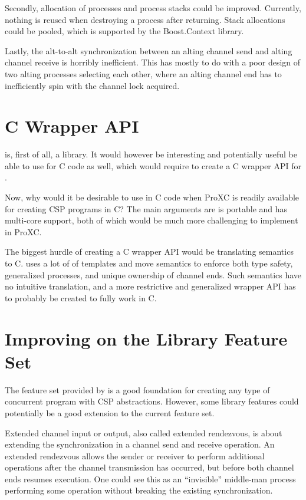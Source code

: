 Secondly, allocation of processes and process stacks could be improved. Currently, nothing is reused when destroying a process after returning. Stack allocations could be pooled, which is supported by the Boost.Context library. 

Lastly, the alt\hyp{}to\hyp{}alt synchronization between an alting channel send and alting channel receive is horribly inefficient. This has mostly to do with a poor design of two alting processes selecting each other, where an alting channel end has to inefficiently spin with the channel lock acquired.


\section{C Wrapper API}


\Proxc{} is, first of all, a \Cpp{} library. It would however be interesting and potentially useful be able to use \Proxc{} for C code as well, which would require to create a C wrapper API for \Proxc{}.

Now, why would it be desirable to use \Proxc{} in C code when ProXC is readily available for creating CSP programs in C? The main arguments are \Proxc{} is portable and has multi\hyp{}core support, both of which would be much more challenging to implement in ProXC.

The biggest hurdle of creating a C wrapper API would be translating \Cpp{} semantics to C. \Proxc{} uses a lot of of templates and move semantics to enforce both type safety, generalized processes, and unique ownership of channel ends. Such semantics have no intuitive translation, and a more restrictive and generalized wrapper API has to probably be created to fully work in C.


\section{Improving on the Library Feature Set}


The feature set provided by \Proxc{} is a good foundation for creating any type of concurrent program with CSP abstractions. However, some library features could potentially be a good extension to the current feature set.

Extended channel input or output, also called extended rendezvous, is about extending the synchronization in a channel send and receive operation. An extended rendezvous allows the sender or receiver to perform additional operations after the channel transmission has occurred, but before both channel ends resumes execution. One could see this as an ``invisible'' middle\hyp{}man process performing some operation without breaking the existing synchronization.

